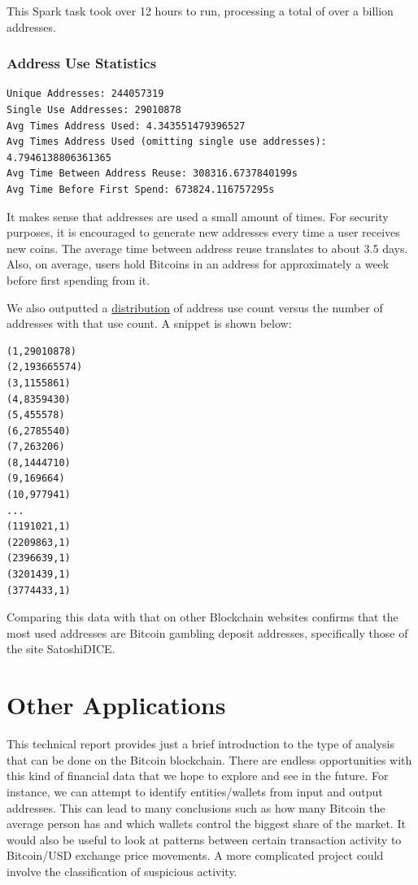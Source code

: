 \documentclass[9pt,twocolumn,twoside]{idsi}
\begin{document}
This Spark task took over 12 hours to run, processing a total of over a billion addresses.

\subsubsection{Address Use Statistics}
\begin{lstlisting}
Unique Addresses: 244057319
Single Use Addresses: 29010878
Avg Times Address Used: 4.343551479396527
Avg Times Address Used (omitting single use addresses): 4.7946138806361365
Avg Time Between Address Reuse: 308316.6737840199s
Avg Time Before First Spend: 673824.116757295s
\end{lstlisting}

It makes sense that addresses are used a small amount of times. For security purposes, it is encouraged to generate new addresses every time a user receives new coins. The average time between address reuse translates to about 3.5 days. Also, on average, users hold Bitcoins in an address for approximately a week before first spending from it.

We also outputted a \href{https://github.com/nishilshah17/idsi_bitcoin/blob/44ec93f337bdf620b56f4343650f2a572aca2cb4/data/output/address_use/address_use_count.txt}{distribution} of address use count versus the number of addresses with that use count. A snippet is shown below:

\begin{lstlisting}
(1,29010878)
(2,193665574)
(3,1155861)
(4,8359430)
(5,455578)
(6,2785540)
(7,263206)
(8,1444710)
(9,169664)
(10,977941)
...
(1191021,1)
(2209863,1)
(2396639,1)
(3201439,1)
(3774433,1)
\end{lstlisting}

Comparing this data with that on other Blockchain websites confirms that the most used addresses are Bitcoin gambling deposit addresses, specifically those of the site SatoshiDICE.

\section{Other Applications}
This technical report provides just a brief introduction to the type of analysis that can be done on the Bitcoin blockchain. There are endless opportunities with this kind of financial data that we hope to explore and see in the future. For instance, we can attempt to identify entities/wallets from input and output addresses. This can lead to many conclusions such as how many Bitcoin the average person has and which wallets control the biggest share of the market. It would also be useful to look at patterns between certain transaction activity to Bitcoin/USD exchange price movements. A more complicated project could involve the classification of suspicious activity.
\end{document}
